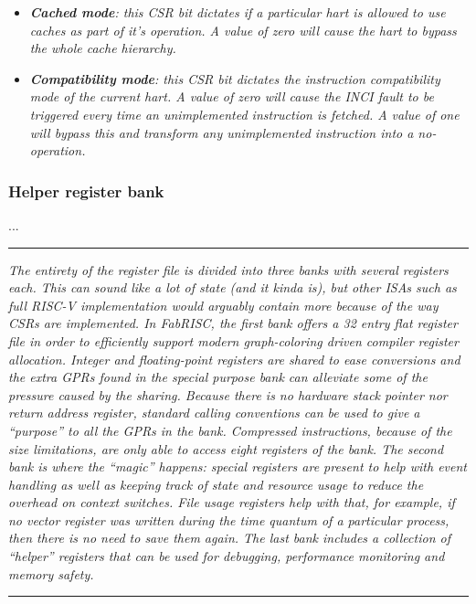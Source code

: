 \begin{itemize}
                \item \textit{\textbf{Cached mode}: this CSR bit dictates if a particular hart is allowed to use caches as part of it's operation. A value of zero will cause the hart to bypass the whole cache hierarchy.}

                \item \textit{\textbf{Compatibility mode}: this CSR bit dictates the instruction compatibility mode of the current hart. A value of zero will cause the INCI fault to be triggered every time an unimplemented instruction is fetched. A value of one will bypass this and transform any unimplemented instruction into a no-operation.}

            \end{itemize}

        \subsubsection{Helper register bank}

            \vspace{10pt}

            ...

        \par\noindent\rule{\textwidth}{0.4pt}
        \textit{The entirety of the register file is divided into three banks with several registers each. This can sound like a lot of state (and it kinda is), but other ISAs such as full RISC-V implementation would arguably contain more because of the way CSRs are implemented. In FabRISC, the first bank offers a 32 entry flat register file in order to efficiently support modern graph-coloring driven compiler register allocation. Integer and floating-point registers are shared to ease conversions and the extra GPRs found in the special purpose bank can alleviate some of the pressure caused by the sharing. Because there is no hardware stack pointer nor return address register, standard calling conventions can be used to give a ``purpose'' to all the GPRs in the bank. Compressed instructions, because of the size limitations, are only able to access eight registers of the bank. The second bank is where the ``magic'' happens: special registers are present to help with event handling as well as keeping track of state and resource usage to reduce the overhead on context switches. File usage registers help with that, for example, if no vector register was written during the time quantum of a particular process, then there is no need to save them again. The last bank includes a collection of ``helper'' registers that can be used for debugging, performance monitoring and memory safety.}
        \par\noindent\rule{\textwidth}{0.4pt}

